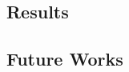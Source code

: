 \documentclass[../Main.tex]{subfiles}
\begin{document}
\subsection{Results}


\subsection{Future Works}


\biblio %
\end{document}

